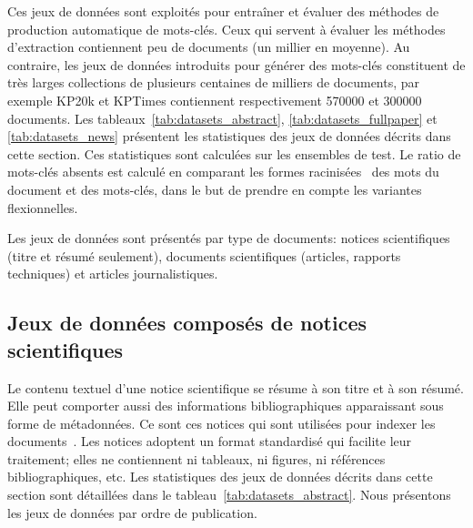 Ces jeux de données sont exploités pour entraîner et évaluer des méthodes de production automatique de mots-clés.
Ceux qui servent à évaluer les méthodes d'extraction contiennent peu de documents (un millier en moyenne). Au contraire, les jeux de données introduits pour générer des mots-clés constituent de très larges collections de plusieurs centaines de milliers de documents, par exemple KP20k et KPTimes contiennent respectivement \num{570 000} et \num{300 000} documents.
%
Les tableaux~\ref{tab:datasets_abstract}, \ref{tab:datasets_fullpaper} et \ref{tab:datasets_news} présentent les statistiques des jeux de données décrits dans cette section.
Ces statistiques sont calculées sur les ensembles de test. Le ratio de mots-clés absents est calculé en comparant les formes racinisées~\cite{porter_algorithm_1980} des mots du document et des mots-clés, dans le but de prendre en compte les variantes flexionnelles.

Les jeux de données sont présentés par type de documents: notices scientifiques (titre et résumé seulement), documents scientifiques (articles, rapports techniques) et articles journalistiques.



\subsection{Jeux de données composés de notices scientifiques}\label{sub:framework_abstract}

Le contenu textuel d'une notice scientifique se résume à son titre et à son résumé. Elle peut comporter aussi des informations bibliographiques apparaissant sous forme de métadonnées.
Ce sont ces notices qui sont utilisées pour indexer les documents~\cite{huang_holes_2019}.
Les notices adoptent un format standardisé qui facilite leur traitement; elles ne contiennent ni tableaux, ni figures, ni références bibliographiques, etc.
Les statistiques des jeux de données décrits dans cette section sont détaillées dans le tableau~\ref{tab:datasets_abstract}.
Nous présentons les jeux de données par ordre de publication.




